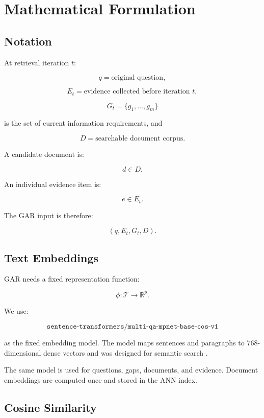 \documentclass[11pt,a4paper]{article}
\begin{document}
\section{Mathematical Formulation}

\subsection{Notation}

At retrieval iteration $t$:

\[
q=\text{original question},
\]

\[
E_t=\text{evidence collected before iteration }t,
\]

\[
G_t=\{g_1,\ldots,g_m\}
\]

is the set of current information requirements, and

\[
D=\text{searchable document corpus}.
\]

A candidate document is:

\[
d\in D.
\]

An individual evidence item is:

\[
e\in E_t.
\]

The GAR input is therefore:

\[
\boxed{(q,E_t,G_t,D)}.
\]

\subsection{Text Embeddings}

GAR needs a fixed representation function:

\[
\phi:\mathcal{T}\rightarrow\mathbb{R}^{p}.
\]

We use:

\[
\boxed{
\texttt{sentence-transformers/multi-qa-mpnet-base-cos-v1}
}
\]

as the fixed embedding model. The model maps sentences and paragraphs to 768-dimensional dense vectors and was designed for semantic search \citep{reimers-gurevych-2019-sentence,multiqa-mpnet}.

The same model is used for questions, gaps, documents, and evidence. Document embeddings are computed once and stored in the ANN index.

\subsection{Cosine Similarity}
\end{document}
